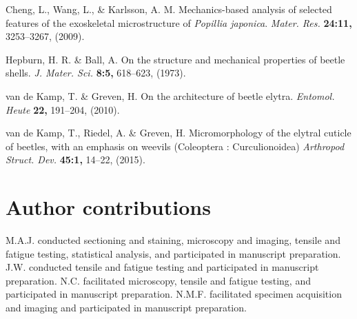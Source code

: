 \documentclass[twocolumn, linenumbers, superscriptaddress, nofootinbib]{revtex4-1}
\begin{document}
\begin{thebibliography}{50}
				Cheng, L., Wang, L., \& Karlsson, A. M.
				Mechanics-based analysis of selected features of the exoskeletal microstructure of \textit{Popillia japonica}.
				\textit{Mater. Res.}
				\textbf{24:11,}
				3253--3267,
				(2009).
				
				Hepburn, H. R. \& Ball, A.
				On the structure and mechanical properties of beetle shells.
				\textit{J. Mater. Sci.}
				\textbf{8:5,}
				618--623,
				(1973).
				
				van de Kamp, T. \& Greven, H.
				On the architecture of beetle elytra.
				\textit{Entomol. Heute}
				\textbf{22,}
				191--204,
				(2010).
			
				van de Kamp, T., Riedel, A. \& Greven, H.
				Micromorphology of the elytral cuticle of beetles, with an emphasis on weevils (Coleoptera : Curculionoidea)
				\textit{Arthropod Struct. Dev.}
				\textbf{45:1,}
				14--22,
				(2015).
			
	\end{thebibliography}

	\begin{acknowledgements}

	\end{acknowledgements}

	\section*{Author contributions}
		M.A.J. conducted sectioning and staining, microscopy and imaging, tensile and fatigue testing, statistical analysis, and participated in manuscript preparation.
		J.W. conducted tensile and fatigue testing and participated in manuscript preparation.
		N.C. facilitated microscopy, tensile and fatigue testing, and participated in manuscript preparation.
		N.M.F. facilitated specimen acquisition and imaging and participated in manuscript preparation.
	
\end{document}
